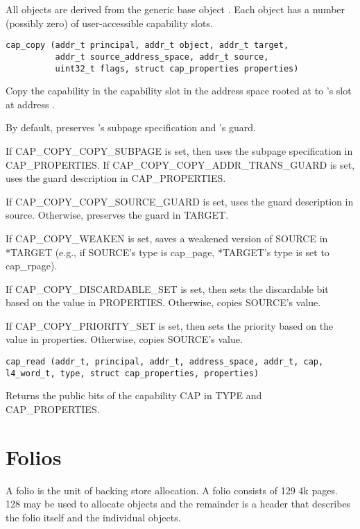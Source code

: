 All objects are derived from the generic base object .
Each object has a number (possibly zero) of user-accessible capability
slots.

\begin{lstlisting}
cap_copy (addr_t principal, addr_t object, addr_t target,
          addr_t source_address_space, addr_t source,
          uint32_t flags, struct cap_properties properties)
\end{lstlisting}

Copy the capability in the capability slot  in the address
space rooted at  to 's slot at
address .

By default, preserves 's subpage specification and
's guard.

If CAP\_COPY\_COPY\_SUBPAGE is set, then uses the subpage
specification in CAP\_PROPERTIES.  If CAP\_COPY\_COPY\_ADDR\_TRANS\_GUARD
is set, uses the guard description in CAP\_PROPERTIES.

If CAP\_COPY\_COPY\_SOURCE\_GUARD is set, uses the guard description in
source.  Otherwise, preserves the guard in TARGET.

If CAP\_COPY\_WEAKEN is set, saves a weakened version of SOURCE in
*TARGET (e.g., if SOURCE's type is cap\_page, *TARGET's type is set
to cap\_rpage).

If CAP\_COPY\_DISCARDABLE\_SET is set, then sets the discardable bit
based on the value in PROPERTIES.  Otherwise, copies SOURCE's
value.

If CAP\_COPY\_PRIORITY\_SET is set, then sets the priority based on
the value in properties.  Otherwise, copies SOURCE's value.


\begin{lstlisting}
cap_read (addr_t, principal, addr_t, address_space, addr_t, cap,
l4_word_t, type, struct cap_properties, properties)
\end{lstlisting}

Returns the public bits of the capability CAP in TYPE and
CAP\_PROPERTIES.

\clearpage
\section{Folios}

A folio is the unit of backing store allocation.  A folio consists of
129 4k pages.  128 may be used to allocate objects and the remainder
is a header that describes the folio itself and the individual
objects.

